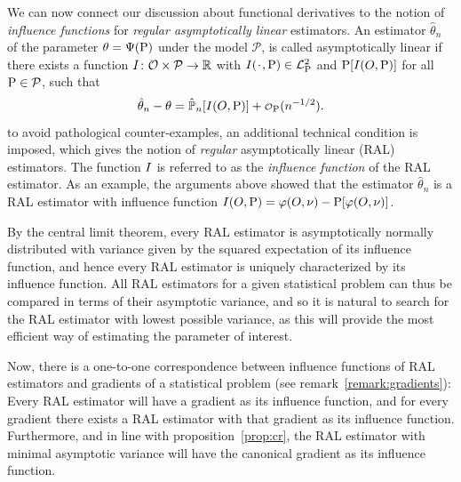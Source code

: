 \documentclass[a4,danish]{article}
\begin{document}
We can now connect our discussion about functional derivatives to the notion of \textit{influence
  functions} for \textit{regular asymptotically linear} estimators. An estimator $\hat{\theta}_n$ of
the parameter $\theta = \TT(\P)$ under the model $\mathcal{P}$, is called asymptotically linear if
there exists a function $\ic\colon \mathcal{O} \times \mathcal{P} \rightarrow \R$ with
$\ic(\blank, \P) \in \lp$ and $\P[\ic(O, \P)]$ for all $\P \in \mathcal{P}$, such that
\begin{equation*}
  \hat{\theta}_n - \theta = \empmeas[\ic(O, \P)] + \smallO_{\P}(n^{-1/2}).
\end{equation*}
to avoid pathological counter-examples, an additional technical  condition is imposed, which gives the notion of \textit{regular}
asymptotically linear (RAL) estimators. The function $\ic$ is referred to as the \textit{influence
  function} of the RAL estimator. As an example, the arguments above showed that the estimator
$\hat{\theta}_n$ is a RAL estimator with influence function
$\ic(O, \P) = \phi(O, \nu) - \P[\phi(O, \nu)]$.

By the central limit theorem, every RAL estimator is asymptotically normally distributed with
variance given by the squared expectation of its influence function, and hence every RAL estimator
is uniquely characterized by its influence function. All RAL estimators for a given statistical
problem can thus be compared in terms of their asymptotic variance, and so it is natural to search
for the RAL estimator with lowest possible variance, as this will provide the most efficient way of
estimating the parameter of interest.

Now,  there is a one-to-one
correspondence between influence functions of RAL estimators and gradients of a statistical problem
(see remark~\ref{remark:gradients}): Every RAL estimator will have a gradient as its influence
function, and for every gradient there exists a RAL estimator with that gradient as its influence
function. Furthermore, and in line with proposition~\ref{prop:cr}, the RAL estimator with minimal
asymptotic variance will have the canonical gradient as its influence function. 
\end{document}
